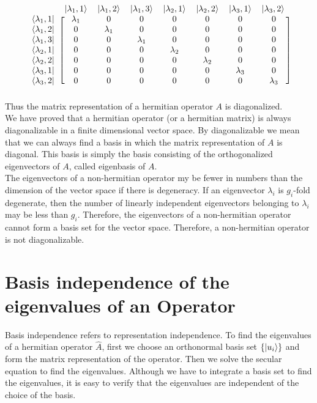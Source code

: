 	\begin{equation}
	\begin{blockarray}{cccccccc}
	\ & \ket{\lambda_1, 1} & \ket{\lambda_1, 2} & \ket{\lambda_1, 3} & \ket{\lambda_2, 1} & \ket{\lambda_2, 2} & \ket{\lambda_3, 1} & \ket{\lambda_3, 2} \\
	\begin{block}{c[ccccccc]}
	\bra{\lambda_1, 1} & \lambda_1 & 0 & 0 & 0 & 0 & 0 & 0 \\
	\bra{\lambda_1, 2} & 0 & \lambda_1 & 0 & 0 & 0 & 0 & 0 \\
	\bra{\lambda_1, 3} & 0 & 0 & \lambda_1 & 0 & 0 & 0 & 0 \\ 
	\bra{\lambda_2, 1} & 0 & 0 & 0 & \lambda_2 & 0 & 0 & 0 \\
	\bra{\lambda_2, 2} & 0 & 0 & 0 & 0 & \lambda_2 & 0 & 0 \\ 
	\bra{\lambda_3, 1} & 0 & 0 & 0 & 0 & 0 & \lambda_3 & 0\\
	\bra{\lambda_3, 2} & 0 & 0 & 0 & 0 & 0 & 0 & \lambda_3  \\ 
	\end{block}
	\end{blockarray}
	\end{equation}
	Thus the matrix representation of a hermitian operator $A$ is diagonalized.\\
	
	We have proved that a hermitian operator (or a hermitian matrix) is always diagonalizable in a finite dimensional vector space. By diagonalizable we mean that we can always find a basis in which the matrix representation of $A$ is diagonal. This basis is simply the basis consisting of the orthogonalized eigenvectors of $A$, called eigenbasis of $A$.\\
	
	 The eigenvectors of a non-hermitian operator my be fewer in numbers than the dimension of the vector space if there is degeneracy. If an  eigenvector $\lambda_i$ is $g_i$-fold degenerate, then the number of linearly independent eigenvectors belonging to $\lambda_i$ may be less than $g_i$. Therefore, the eigenvectors of a non-hermitian operator cannot form a basis set for the vector space. Therefore, a non-hermitian operator is not diagonalizable.
	
	
	\section{Basis independence of the eigenvalues of an Operator}
	Basis independence refers to representation independence. To find the eigenvalues of a hermitian operator $\hat{A}$, first we choose an orthonormal basis set $\{\ket{u_i}\}$ and form the matrix representation of the operator. Then we solve the secular equation to find the eigenvalues. Although we have to integrate a basis set to find the eigenvalues, it is easy to verify that the eigenvalues are independent of the choice of the basis. \\
	
